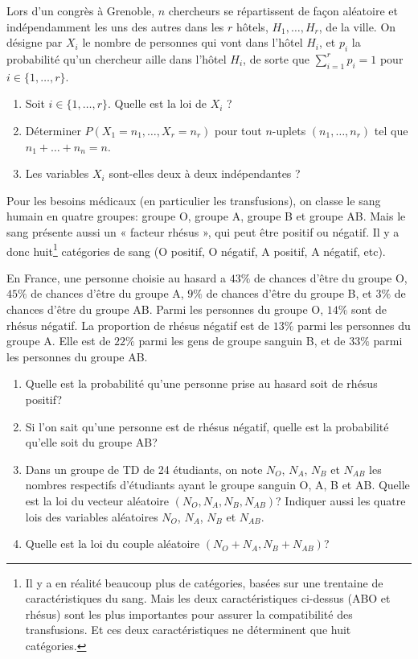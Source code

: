 \documentclass[a4paper,12pt,reqno]{amsart}
\begin{document}
\begin{exo}

  Lors d'un congrès à Grenoble, $n$ chercheurs se répartissent de façon aléatoire et indépendamment les uns des autres dans les $r$ hôtels, $H_1,\ldots,H_r$, de la ville. On désigne par $X_i$ le nombre de personnes qui vont dans l'hôtel $H_i$, et $p_i$ la probabilité qu'un chercheur aille dans l'hôtel $H_i$, de sorte que $\sum_{i=1}^rp_i=1$ pour $i\in\{1,\ldots,r\}$.
  \begin{enumerate}
    \item Soit $i\in\{1,\ldots,r\}$. Quelle est la loi de $X_i$ ?
    \item Déterminer  $P(X_1=n_1,\ldots,X_r=n_r)$ pour tout $n$-uplets $(n_1,\ldots,n_r)$ tel que $n_1+\ldots +n_n=n$.
    \item Les variables $X_i$ sont-elles deux à deux indépendantes ?
  \end{enumerate}

\end{exo}

\begin{exo}

  Pour les besoins médicaux (en particulier les transfusions), on classe le sang humain en quatre groupes: groupe O, groupe A, groupe B et groupe AB. Mais le sang présente aussi un « facteur rhésus », qui peut être positif ou négatif. Il y a donc huit\footnote{Il y a en réalité beaucoup plus de catégories, basées sur une trentaine de caractéristiques du sang. Mais les deux caractéristiques ci-dessus (ABO et rhésus) sont les plus importantes pour assurer la compatibilité des transfusions. Et ces deux caractéristiques ne déterminent que huit catégories.} catégories de sang (O positif, O négatif, A positif, A négatif, etc).

  En France, une personne choisie au hasard a $43\%$ de chances d'être du groupe O, $45\%$ de chances d'être du groupe A, $9\%$ de chances d'être du groupe B, et $3\%$ de chances d'être du groupe AB.
  Parmi les personnes du groupe O, $14\%$ sont de rhésus négatif. La proportion de rhésus négatif est de $13\%$ parmi les personnes du groupe A. Elle est de $22\%$ parmi les gens de groupe sanguin B, et de $33\%$ parmi les personnes du groupe AB.
  \begin{enumerate}
    \item Quelle est la probabilité qu'une personne prise au hasard soit de rhésus positif?
    \item Si l'on sait qu'une personne est de rhésus négatif, quelle est la probabilité qu'elle soit du groupe AB?
    \item Dans un groupe de TD de 24 étudiants, on note $N_O$, $N_A$, $N_B$ et $N_{AB}$ les nombres respectifs d'étudiants ayant le groupe sanguin O, A, B et AB. Quelle est la loi du vecteur aléatoire  $(N_O,N_A,N_B,N_{AB})$? Indiquer aussi les quatre lois des variables aléatoires $N_O$, $N_A$, $N_B$ et $N_{AB}$.
    \item Quelle est la loi du couple aléatoire $(N_O+N_A,N_B+N_{AB})$?
  \end{enumerate}
\end{exo}
\end{document}
